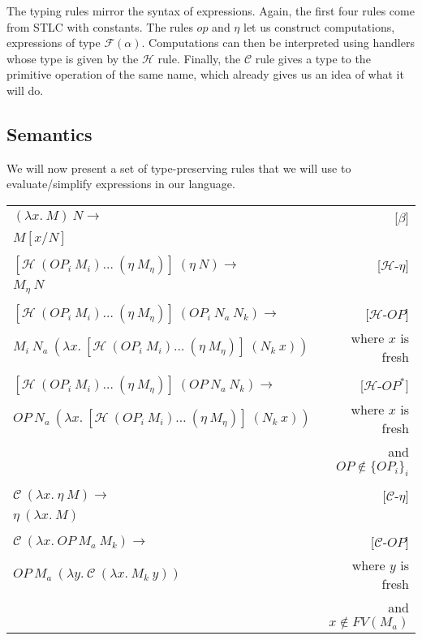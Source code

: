 \documentclass{article}
\begin{document}
The typing rules mirror the syntax of expressions. Again, the first four
rules come from STLC with constants. The rules $op$ and $\eta$ let us
construct computations, expressions of type
$\mathcal{F}(\alpha)$. Computations can then be interpreted using handlers
whose type is given by the $\mathcal{H}$ rule. Finally, the $\mathcal{C}$
rule gives a type to the primitive operation of the same name, which
already gives us an idea of what it will do.


\subsection{Semantics}

We will now present a set of type-preserving rules that we will use to
evaluate/simplify expressions in our language.

\vspace{3mm}

\begin{tabular}{lr}
  $(\lambda x.\ M)\ N \rightarrow$ & [$\beta$] \\
  $M[x/N]$ & \\
  \\
  $[\mathcal{H}\ (OP_i\ M_i)\ldots\ (\eta\ M_\eta)]\ (\eta\ N) \rightarrow$ & [$\mathcal{H}$-$\eta$] \\
  $M_\eta\ N$ & \\
  \\
  $[\mathcal{H}\ (OP_i\ M_i)\ldots\ (\eta\ M_\eta)]\ (OP_i\ N_a\ N_k) \rightarrow$ & [$\mathcal{H}$-$OP$] \\
  $M_i\ N_a\ (\lambda x.\ [\mathcal{H}\ (OP_i\ M_i)\ldots\ (\eta\ M_\eta)]\ (N_k\ x))$ & where $x$ is fresh \\
  \\
  $[\mathcal{H}\ (OP_i\ M_i)\ldots\ (\eta\ M_\eta)]\ (OP\ N_a\ N_k) \rightarrow$ & [$\mathcal{H}$-$OP^*$] \\
  $OP\ N_a\ (\lambda x.\ [\mathcal{H}\ (OP_i\ M_i)\ldots\ (\eta\ M_\eta)]\ (N_k\ x))$ & where $x$ is fresh \\
  & and $OP \notin \{OP_i\}_i$ \\
  \\
  $\mathcal{C}\ (\lambda x.\ \eta\ M) \rightarrow$ & [$\mathcal{C}$-$\eta$] \\
  $\eta\ (\lambda x.\ M)$ & \\
  \\
  $\mathcal{C}\ (\lambda x.\ OP\ M_a\ M_k) \rightarrow$ & [$\mathcal{C}$-$OP$] \\
  $OP\ M_a\ (\lambda y.\ \mathcal{C}\ (\lambda x.\ M_k\ y))$ & where $y$ is fresh \\
  & and $x \notin FV(M_a)$
\end{tabular}
\end{document}
